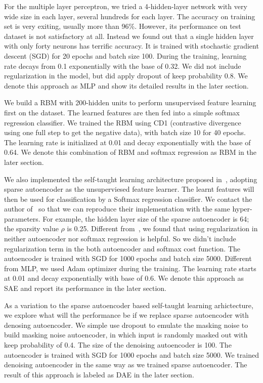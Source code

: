 For the multiple layer perceptron, we tried a 4-hidden-layer network with
very wide size in each layer, several hundreds for each layer.
The accuracy on training set is very exiting, usually more than 96\%.
However, its performance on test dataset is not satisfactory at all.
Instead we found out that a single hidden layer with only forty neurons has terrific accuracy.
It is trained with stochastic gradient descent (SGD) for 20 epochs and batch size 100.
During the training, learning rate decays from 0.1 exponentially with the base of 0.32.
We did not include regularization in the model, but did apply dropout of keep probability 0.8.
We denote this approach as MLP and show its detailed results in the later section.

We build a RBM with 200-hidden units to perform unsupervised feature learning first on the dataset.
The learned features are then fed into a simple softmax regression classifier.
We trained the RBM using CD1 (contrastive divergence using one full step to get the negative data),
with batch size 10 for 40 epochs.
The learning rate is initialized at 0.01 and decay exponentially with the base of 0.64.
We denote this combination of RBM and softmax regression as RBM in the later section.

We also implemented the self-taught learning architecture proposed in~\cite{STL-NIDS, SparseAE},
adopting sparse autoencoder as the unsuperviesed feature learner.
The learnt features will then be used for classification by a Softmax regression classifier.
We contact the author of~\cite{STL-NIDS} so that we can reproduce their implementation
with the same hyper-parameters.
For example, the hidden layer size of the sparse autoencoder is 64;
the sparsity value $\rho$ is 0.25.
Different from~\cite{STL-NIDS}, we found that using regularization in
neither autoencoder nor softmax regression is helpful.
So we didn't include regularization term in the both autoencoder and softmax cost function.
The autoencoder is trained with SGD for 1000 epochs and batch size 5000.
Different from MLP, we used Adam optimizer during the training.
The learning rate starts at 0.01 and decay exponentially with base of 0.6.
We denote this approach as SAE and report its performance in the later section.

As a variation to the sparse autoencoder based self-taught learning arhictecture,
we explore what will the performance be if we replace sparse autoencoder with denosing autoencoder.
We simple use dropout to emulate the masking noise to build masking noise autoencoder,
in which input is randomly masked out with keep probability of 0.4.
The size of the denoising autoencoder is 100.
The autoencoder is trained with SGD for 1000 epochs and batch size 5000.
We trained denoising autoencoder in the same way as we trained sparse autoencoder.
The result of this approach is labeled as DAE in the later section.

